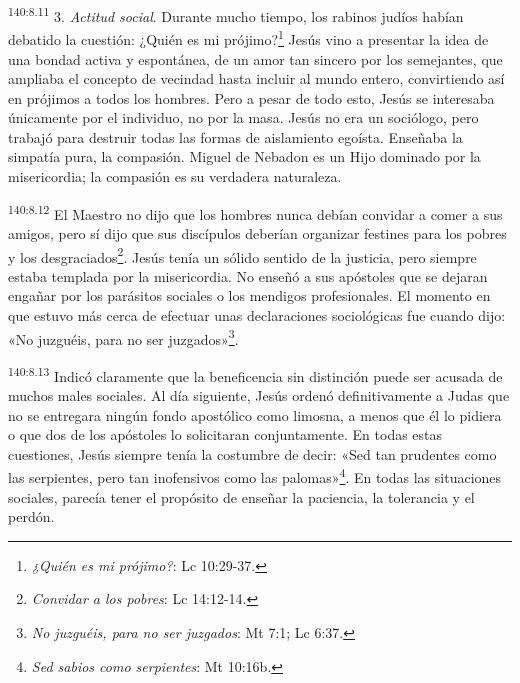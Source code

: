 \par 
\textsuperscript{140:8.11} 3. \textit{Actitud social}. Durante mucho tiempo, los rabinos judíos habían debatido la cuestión: ¿Quién es mi prójimo?\footnote{\textit{¿Quién es mi prójimo?}: Lc 10:29-37.} Jesús vino a presentar la idea de una bondad activa y espontánea, de un amor tan sincero por los semejantes, que ampliaba el concepto de vecindad hasta incluir al mundo entero, convirtiendo así en prójimos a todos los hombres. Pero a pesar de todo esto, Jesús se interesaba únicamente por el individuo, no por la masa. Jesús no era un sociólogo, pero trabajó para destruir todas las formas de aislamiento egoísta. Enseñaba la simpatía pura, la compasión. Miguel de Nebadon es un Hijo dominado por la misericordia; la compasión es su verdadera naturaleza.

\par 
\textsuperscript{140:8.12} El Maestro no dijo que los hombres nunca debían convidar a comer a sus amigos, pero sí dijo que sus discípulos deberían organizar festines para los pobres y los desgraciados\footnote{\textit{Convidar a los pobres}: Lc 14:12-14.}. Jesús tenía un sólido sentido de la justicia, pero siempre estaba templada por la misericordia. No enseñó a sus apóstoles que se dejaran engañar por los parásitos sociales o los mendigos profesionales. El momento en que estuvo más cerca de efectuar unas declaraciones sociológicas fue cuando dijo: «No juzguéis, para no ser juzgados»\footnote{\textit{No juzguéis, para no ser juzgados}: Mt 7:1; Lc 6:37.}.

\par 
\textsuperscript{140:8.13} Indicó claramente que la beneficencia sin distinción puede ser acusada de muchos males sociales. Al día siguiente, Jesús ordenó definitivamente a Judas que no se entregara ningún fondo apostólico como limosna, a menos que él lo pidiera o que dos de los apóstoles lo solicitaran conjuntamente. En todas estas cuestiones, Jesús siempre tenía la costumbre de decir: «Sed tan prudentes como las serpientes, pero tan inofensivos como las palomas»\footnote{\textit{Sed sabios como serpientes}: Mt 10:16b.}. En todas las situaciones sociales, parecía tener el propósito de enseñar la paciencia, la tolerancia y el perdón.

